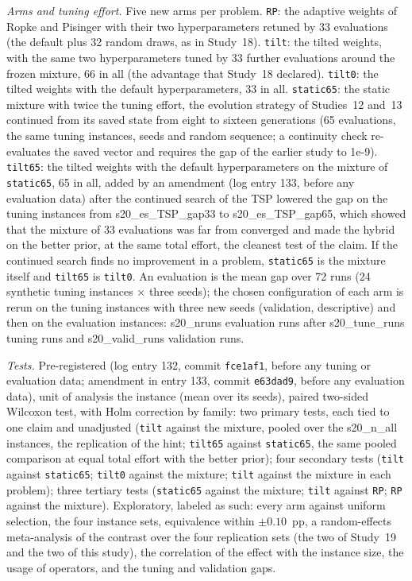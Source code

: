 \emph{Arms and tuning effort.} Five new arms per problem. \texttt{RP}: the adaptive weights of Ropke and Pisinger with their two hyperparameters retuned by 33 evaluations (the default plus 32 random draws, as in Study~18). \texttt{tilt}: the tilted weights, with the same two hyperparameters tuned by 33 further evaluations around the frozen mixture, 66 in all (the advantage that Study~18 declared). \texttt{tilt0}: the tilted weights with the default hyperparameters, 33 in all. \texttt{static65}: the static mixture with twice the tuning effort, the evolution strategy of Studies~12 and~13 continued from its saved state from eight to sixteen generations (65 evaluations, the same tuning instances, seeds and random sequence; a continuity check re-evaluates the saved vector and requires the gap of the earlier study to 1e-9). \texttt{tilt65}: the tilted weights with the default hyperparameters on the mixture of \texttt{static65}, 65 in all, added by an amendment (log entry 133, before any evaluation data) after the continued search of the TSP lowered the gap on the tuning instances from \num{s20_es_TSP_gap33} to \num{s20_es_TSP_gap65}, which showed that the mixture of 33 evaluations was far from converged and made the hybrid on the better prior, at the same total effort, the cleanest test of the claim. If the continued search finds no improvement in a problem, \texttt{static65} is the mixture itself and \texttt{tilt65} is \texttt{tilt0}. An evaluation is the mean gap over 72 runs (24 synthetic tuning instances $\times$ three seeds); the chosen configuration of each arm is rerun on the tuning instances with three new seeds (validation, descriptive) and then on the evaluation instances: \num{s20_nruns} evaluation runs after \num{s20_tune_runs} tuning runs and \num{s20_valid_runs} validation runs.

\emph{Tests.} Pre-registered (log entry 132, commit \texttt{fce1af1}, before any tuning or evaluation data; amendment in entry 133, commit \texttt{e63dad9}, before any evaluation data), unit of analysis the instance (mean over its seeds), paired two-sided Wilcoxon test, with Holm correction by family: two primary tests, each tied to one claim and unadjusted (\texttt{tilt} against the mixture, pooled over the \num{s20_n_all} instances, the replication of the hint; \texttt{tilt65} against \texttt{static65}, the same pooled comparison at equal total effort with the better prior); four secondary tests (\texttt{tilt} against \texttt{static65}; \texttt{tilt0} against the mixture; \texttt{tilt} against the mixture in each problem); three tertiary tests (\texttt{static65} against the mixture; \texttt{tilt} against \texttt{RP}; \texttt{RP} against the mixture). Exploratory, labeled as such: every arm against uniform selection, the four instance sets, equivalence within $\pm0.10$~pp, a random-effects meta-analysis of the contrast over the four replication sets (the two of Study~19 and the two of this study), the correlation of the effect with the instance size, the usage of operators, and the tuning and validation gaps.

